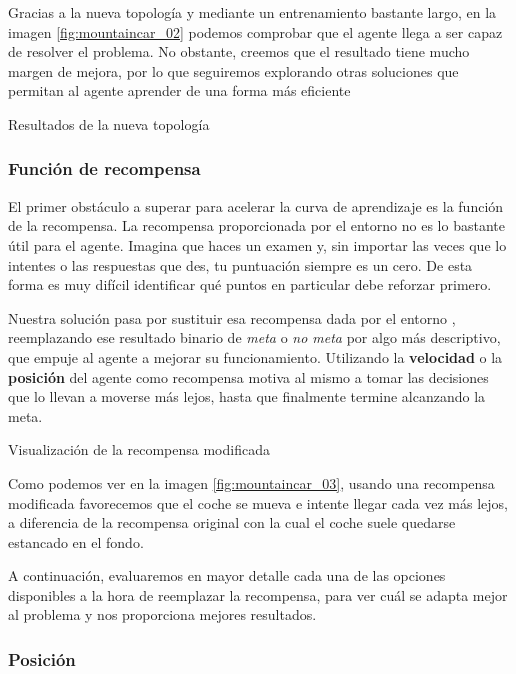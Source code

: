 Gracias a la nueva topología y mediante un entrenamiento bastante largo, en la imagen \ref{fig:mountaincar_02} podemos comprobar que el agente llega a ser capaz de resolver el problema. No obstante, creemos que el resultado tiene mucho margen de mejora, por lo que seguiremos explorando otras soluciones que permitan al agente aprender de una forma más eficiente

%
       {Resultados de la nueva topología}


\subsubsection{Función de recompensa}

El primer obstáculo a superar para acelerar la curva de aprendizaje es la función de la recompensa. La recompensa proporcionada por el entorno no es lo bastante útil para el agente. Imagina que haces un examen y, sin importar las veces que lo intentes o las respuestas que des, tu puntuación siempre es un cero. De esta forma es muy difícil identificar qué puntos en particular debe reforzar primero.

Nuestra solución pasa por sustituir esa recompensa dada por el entorno \citep{mediumTim}, reemplazando ese resultado binario de \textit{meta} o \textit{no meta} por algo más descriptivo, que empuje al agente a mejorar su funcionamiento. Utilizando la \textbf{velocidad} o la \textbf{posición} del agente como recompensa motiva al mismo a tomar las decisiones que lo llevan a moverse más lejos, hasta que finalmente termine alcanzando la meta.

%
       {Visualización de la recompensa modificada}

Como podemos ver en la imagen \ref{fig:mountaincar_03}, usando una recompensa modificada favorecemos que el coche se mueva e intente llegar cada vez más lejos, a diferencia de la recompensa original con la cual el coche suele quedarse estancado en el fondo.

A continuación, evaluaremos en mayor detalle cada una de las opciones disponibles a la hora de reemplazar la recompensa, para ver cuál se adapta mejor al problema y nos proporciona mejores resultados.


\subsubsection*{Posición}

